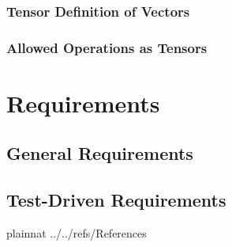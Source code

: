 \documentclass[12pt]{article}
\begin{document}
\subsubsection{Tensor Definition of Vectors}

\subsubsection{Allowed Operations as Tensors}


\section{Requirements}\label{Sec:Req}

\subsection{General Requirements}

\subsection{Test-Driven Requirements}










\newpage

 {plainnat}
 {../../refs/References}
\end{document}

